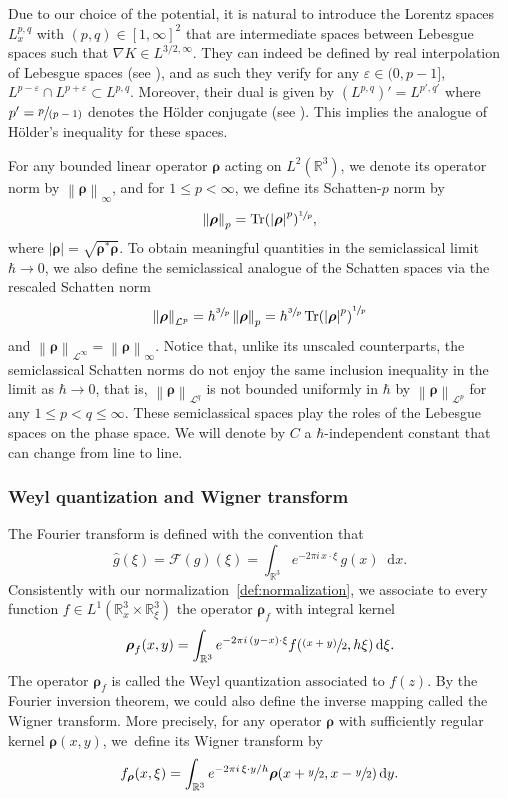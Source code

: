 \documentclass[JEP,XML,SOM,Unicode,NoEqCountersInSection,published]{cedram}
\newcommand{\spfrac}[2]{\sfrac{#1}{(#2)}}
\newcommand{\psfrac}[2]{\sfrac{(#1)}{#2}}
\newcommand {\aTr}[1] {\tr(#1)}
\theoremstyle{definition}
\newcommand {\RR} {\mathbb R}
\newcommand {\Rd} {\RR^3}
\renewcommand {\L} {\mathcal L}
\newcommand {\cL} {\mathcal L}
\newcommand {\ecF} {\mathscr{F}}
\let\lt\left
\let\rt\right
\renewcommand {\(} {\lt(}
\renewcommand {\)} {\rt)}
\newcommand {\n}[1] {\lt\lvert #1 \rt\rvert}
\newcommand {\nrm}[1] {\lt\lVert #1\rt\rVert}
\newcommand {\Nrm}[2] {\nrm{#1}_{#2}}
\let\eps\varepsilon
\renewcommand {\d} {\mathop{}\!\mathrm{d}}
\DeclareMathOperator{\tr} {Tr}
\newcommand {\F}[1] {\ecF\!\( #1 \)}
\newcommand {\Tr}[1] {\tr\!\( #1 \)}
\newcommand {\intd} {\int_{\Rd}}
\newcommand {\op} {\boldsymbol{\rho}}
\begin{document}
Due to our choice of the potential, it is natural to introduce the Lorentz spaces $L^{p,q}_x$ with $(p,q)\in[1,\infty]^2$ that are intermediate spaces between Lebesgue spaces such that $\nabla K \in L^{3/2,\infty}$. They can indeed be defined by real interpolation of Lebesgue spaces (see \eg \cite[Th.\,5.3.1]{bergh_interpolation_1976}), and as such they verify for any $\eps\in(0,p-1]$, $L^{p-\eps} \cap L^{p+\eps} \subset L^{p,q}$. Moreover, their dual is given by $(L^{p,q})' = L^{p',q'}$ where $p' = \spfrac{p}{p-1}$ denotes the Hölder conjugate (see \eg \cite{hunt_lpq_1966}). This implies the analogue of Hölder's inequality for these spaces.

For any bounded linear operator $\op$ acting on $L^2(\Rd)$, we denote its operator norm by $\Nrm{\op}{\infty}$, and for $1\le p < \infty$, we define its Schatten-$p$ norm by
\begin{equation*}
\Nrm{\op}{p}= \aTr{\n{\op}^p}^{\sfrac1p},
\end{equation*}
where $\n{\op} = \sqrt{\op^\ast \op}$. To obtain meaningful quantities in the semiclassical limit \hbox{$\hbar\to 0$}, we also define the semiclassical analogue of the Schatten spaces via the rescaled Schatten norm
\begin{equation*}
\Nrm{\op}{\L^p} = h^{\sfrac3p} \Nrm{\op}{p}= h^{\sfrac3p}\Tr{\n{\op}^p}^{\sfrac1p}
\end{equation*}
and $\Nrm{\op}{\cL^\infty}=\Nrm{\op}{\infty}$. Notice that, unlike its unscaled counterparts, the semiclassical Schatten norms do not enjoy the same inclusion inequality in the limit as $\hbar\to 0$, that is, $\Nrm{\op}{\cL^q}$ is not bounded uniformly in $\hbar$ by $\Nrm{\op}{\cL^p}$ for any $1\le p< q\le \infty$. These semiclassical spaces play the roles of the Lebesgue spaces on the phase space. We will denote by $C$ a $\hbar$-independent constant that can change from line to line.

\subsubsection{Weyl quantization and Wigner transform} The Fourier transform is defined with the convention that
\begin{equation*}
\widehat g(\xi) = {\F{g}(\xi) =} \intd e^{-2\pi i\, x\cdot \xi}\,g(x)\d x.
\end{equation*}
Consistently with our normalization~\eqref{def:normalization}, we associate to every function \hbox{$f \!\in\! L^1(\Rd_x\!\times\!\Rd_{\xi})$} the operator $\op_f$ with integral kernel
\begin{equation*}
\op_f(x, y) = \intd e^{-2\pi i\, (y-x)\cdot \xi} f(\psfrac{x+y}{2}, h\xi)\d \xi.
\end{equation*}
The operator $\op_f$ is called the Weyl quantization associated to $f(z)$. By the Fourier inversion theorem, we could also define the inverse mapping called the Wigner transform. More precisely, for any operator $\op$ with sufficiently regular kernel $\op(x, y)$, we~define its Wigner transform by
\begin{equation*}
f_{\op}(x, \xi) = \intd e^{-2\pi i\, \xi\cdot y/h} \op(x+\sfrac{y}{2}, x-\sfrac{y}{2})\d y.
\end{equation*}
\end{document}
